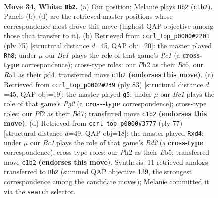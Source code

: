 \documentclass[11pt]{article}
\begin{document}
\clearpage

\begin{figure}[p]\centering
\begin{subfigure}{0.46\textwidth}\centering
\resizebox{\linewidth}{!}{%
\newchessgame
\chessboard[
  setfen={6r1/3n1k2/8/8/p1p1p3/P1P3Pp/2PK1P1P/R1B5 w - - 1 34},
  showmover=false,
  pgfstyle=straightmove, color=movearrow, markmove={c1-b2}
]}
\caption{}
\end{subfigure}\hfill
\begin{subfigure}{0.46\textwidth}\centering
\resizebox{\linewidth}{!}{%
\newchessgame
\chessboard[
  setfen={4r3/1p6/p1b1kpp1/3p4/3P1BP1/P4P2/P4K2/1R6 b - - 1 38},
  showmover=false,
  pgfstyle=straightmove, color=movearrow, markmove={e8-h8}
]}
\caption{}
\end{subfigure}
\\[4pt]
\begin{subfigure}{0.46\textwidth}\centering
\resizebox{\linewidth}{!}{%
\newchessgame
\chessboard[
  setfen={8/3b2p1/5k1p/1p1Ppp2/p7/P4P1P/8/4R2K b - - 2 42},
  showmover=false,
  pgfstyle=straightmove, color=movearrow, markmove={g7-g5}
]}
\caption{}
\end{subfigure}\hfill
\begin{subfigure}{0.46\textwidth}\centering
\resizebox{\linewidth}{!}{%
\newchessgame
\chessboard[
  setfen={8/1p1r1k2/2p1p1p1/1b6/1P1P1P1P/2R5/5K2/6R1 b - - 0 39},
  showmover=false,
  pgfstyle=straightmove, color=movearrow, markmove={d7-d4}
]}
\caption{}
\end{subfigure}
\caption{\textbf{Move 34, White: \texttt{Bb2}.} (a) Our position; Melanie plays \texttt{Bb2} (\texttt{c1b2}). Panels (b)--(d) are the retrieved master positions whose correspondence most drove this move (highest QAP objective among those that transfer to it). (b) Retrieved from \texttt{ccrl\_top\_p0000\#2201} (ply 75) [structural distance $d$=45, QAP obj=20]: the master played \texttt{Rh8}; under $\mu$ our \emph{Bc1} plays the role of that game's \emph{Re1} (a \textbf{cross-type} correspondence); cross-type roles: our \emph{P}h2 as their \emph{B}c6, our \emph{R}a1 as their \emph{p}d4; transferred move \texttt{c1b2} \textbf{(endorses this move)}. (c) Retrieved from \texttt{ccrl\_top\_p0002\#239} (ply 83) [structural distance $d$=45, QAP obj=19]: the master played \texttt{g5}; under $\mu$ our \emph{Bc1} plays the role of that game's \emph{Pg2} (a \textbf{cross-type} correspondence); cross-type roles: our \emph{P}f2 as their \emph{B}d7; transferred move \texttt{c1b2} \textbf{(endorses this move)}. (d) Retrieved from \texttt{ccrl\_top\_p0000\#3777} (ply 77) [structural distance $d$=49, QAP obj=18]: the master played \texttt{Rxd4}; under $\mu$ our \emph{Bc1} plays the role of that game's \emph{Rd2} (a \textbf{cross-type} correspondence); cross-type roles: our \emph{P}h2 as their \emph{B}b5; transferred move \texttt{c1b2} \textbf{(endorses this move)}. Synthesis: 11 retrieved analogs transferred to \texttt{Bb2} (summed QAP objective 139, the strongest correspondence among the candidate moves); Melanie committed it via the \texttt{search} selector.}
\label{fig:thought-m66}
\end{figure}
\end{document}
